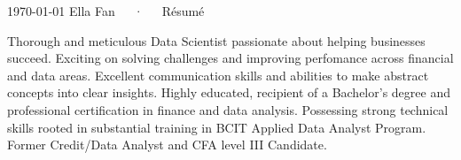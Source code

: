 \documentclass[11pt, a4paper]{awesome-cv}
\begin{document}
\makecvheader[C]

\makecvfooter
  {\today}
  {Ella Fan~~~·~~~Résumé}
  {\thepage}


% 
% 
% 
% 
% 




\begin{cvparagraph}

Thorough and meticulous Data Scientist passionate about helping businesses succeed.
Exciting on solving challenges and improving perfomance across financial and data areas.
Excellent communication skills and abilities to make abstract concepts into clear insights.
Highly educated, recipient of a Bachelor's degree and professional certification in finance and data analysis. 
Possessing strong technical skills rooted in substantial training in BCIT Applied Data Analyst Program.
Former Credit/Data Analyst and CFA level III Candidate.
\end{cvparagraph}

\end{document}
